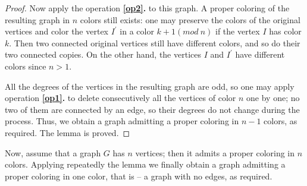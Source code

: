 \begin{problem}
\begin{proof}
Now apply the operation \textbf{\ref{op2}.} to this graph. A proper coloring of the resulting graph in $n$ colors still exists: one may preserve the colors of the original vertices and color the vertex $I^\prime$ in a color $k+1 (mod \  n)$ if the vertex $I$ has color $k$. Then two connected original vertices still have different colors, and so do their two connected copies. On the other hand, the vertices $I$ and $I^\prime$ have different colors since $n > 1$.

All the degrees of the vertices in the resulting graph are odd, so one may apply operation \textbf{\ref{op1}.} to delete consecutively all the vertices of color $n$ one by one; no two of them are connected by an edge, so their degrees do not change during the process. Thus, we obtain a graph admitting a proper coloring in $n - 1$ colors, as required. The lemma is proved. 
\end{proof}

Now, assume that a graph $G$ has $n$ vertices; then it admits a proper coloring in $n$ colors. Applying repeatedly the lemma we finally obtain a graph admitting a proper coloring in one color, that is -- a graph with no edges, as required.
\end{problem}
%
\filbreak

